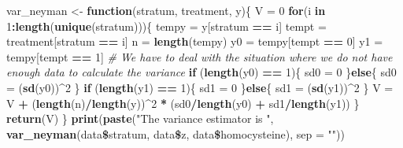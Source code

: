 \documentclass[]{article}
\newenvironment{Shaded}{\begin{snugshade}}{\end{snugshade}}
\newcommand{\KeywordTok}[1]{\textcolor[rgb]{0.13,0.29,0.53}{\textbf{#1}}}
\newcommand{\DataTypeTok}[1]{\textcolor[rgb]{0.13,0.29,0.53}{#1}}
\newcommand{\DecValTok}[1]{\textcolor[rgb]{0.00,0.00,0.81}{#1}}
\newcommand{\StringTok}[1]{\textcolor[rgb]{0.31,0.60,0.02}{#1}}
\newcommand{\CommentTok}[1]{\textcolor[rgb]{0.56,0.35,0.01}{\textit{#1}}}
\newcommand{\ControlFlowTok}[1]{\textcolor[rgb]{0.13,0.29,0.53}{\textbf{#1}}}
\newcommand{\OperatorTok}[1]{\textcolor[rgb]{0.81,0.36,0.00}{\textbf{#1}}}
\newcommand{\NormalTok}[1]{#1}
\begin{document}
\begin{Shaded}
\begin{Highlighting}[]
\NormalTok{var_neyman <-}\StringTok{ }\ControlFlowTok{function}\NormalTok{(stratum, treatment, y)\{}
\NormalTok{  V =}\StringTok{ }\DecValTok{0}
  \ControlFlowTok{for}\NormalTok{(i }\ControlFlowTok{in} \DecValTok{1}\OperatorTok{:}\KeywordTok{length}\NormalTok{(}\KeywordTok{unique}\NormalTok{(stratum)))\{}
\NormalTok{    tempy =}\StringTok{ }\NormalTok{y[stratum }\OperatorTok{==}\StringTok{ }\NormalTok{i]}
\NormalTok{    tempt =}\StringTok{ }\NormalTok{treatment[stratum }\OperatorTok{==}\StringTok{ }\NormalTok{i]}
\NormalTok{    n =}\StringTok{ }\KeywordTok{length}\NormalTok{(tempy)}
\NormalTok{    y0 =}\StringTok{ }\NormalTok{tempy[tempt }\OperatorTok{==}\StringTok{ }\DecValTok{0}\NormalTok{]}
\NormalTok{    y1 =}\StringTok{ }\NormalTok{tempy[tempt }\OperatorTok{==}\StringTok{ }\DecValTok{1}\NormalTok{]}
    \CommentTok{# We have to deal with the situation where we do not have enough data to calculate the variance}
    \ControlFlowTok{if}\NormalTok{ (}\KeywordTok{length}\NormalTok{(y0) }\OperatorTok{==}\StringTok{ }\DecValTok{1}\NormalTok{)\{}
\NormalTok{      sd0 =}\StringTok{ }\DecValTok{0}
\NormalTok{    \}}\ControlFlowTok{else}\NormalTok{\{}
\NormalTok{      sd0 =}\StringTok{ }\NormalTok{(}\KeywordTok{sd}\NormalTok{(y0))}\OperatorTok{^}\DecValTok{2}
\NormalTok{    \}}
    \ControlFlowTok{if}\NormalTok{ (}\KeywordTok{length}\NormalTok{(y1) }\OperatorTok{==}\StringTok{ }\DecValTok{1}\NormalTok{)\{}
\NormalTok{      sd1 =}\StringTok{ }\DecValTok{0}
\NormalTok{    \}}\ControlFlowTok{else}\NormalTok{\{}
\NormalTok{      sd1 =}\StringTok{ }\NormalTok{(}\KeywordTok{sd}\NormalTok{(y1))}\OperatorTok{^}\DecValTok{2}
\NormalTok{    \}}
\NormalTok{    V =}\StringTok{ }\NormalTok{V }\OperatorTok{+}\StringTok{ }\NormalTok{(}\KeywordTok{length}\NormalTok{(n)}\OperatorTok{/}\KeywordTok{length}\NormalTok{(y))}\OperatorTok{^}\DecValTok{2} \OperatorTok{*}\StringTok{ }\NormalTok{(sd0}\OperatorTok{/}\KeywordTok{length}\NormalTok{(y0) }\OperatorTok{+}\StringTok{ }\NormalTok{sd1}\OperatorTok{/}\KeywordTok{length}\NormalTok{(y1))}
\NormalTok{  \}}
  \KeywordTok{return}\NormalTok{(V)}
\NormalTok{\}}
\KeywordTok{print}\NormalTok{(}\KeywordTok{paste}\NormalTok{(}\StringTok{"The variance estimator is "}\NormalTok{, }\KeywordTok{var_neyman}\NormalTok{(data}\OperatorTok{\$}\NormalTok{stratum, data}\OperatorTok{\$}\NormalTok{z, data}\OperatorTok{\$}\NormalTok{homocysteine), }\DataTypeTok{sep =} \StringTok{""}\NormalTok{))}
\end{Highlighting}
\end{Shaded}
\end{document}
